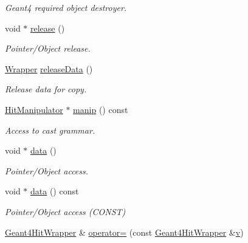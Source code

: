 \begin{DoxyCompactItemize}
\begin{DoxyCompactList}\small\item\em Geant4 required object destroyer. \end{DoxyCompactList}\item 
void $\ast$ \hyperlink{class_d_d4hep_1_1_simulation_1_1_geant4_hit_wrapper_a1af3edf59bb6c955fe91582394854acd}{release} ()
\begin{DoxyCompactList}\small\item\em Pointer/\+Object release. \end{DoxyCompactList}\item 
\hyperlink{class_d_d4hep_1_1_simulation_1_1_geant4_hit_wrapper_a4779e35eba7d553e0f2d497c49a42ec6}{Wrapper} \hyperlink{class_d_d4hep_1_1_simulation_1_1_geant4_hit_wrapper_acec7d2a18d078071d5714dd4a0c45739}{release\+Data} ()
\begin{DoxyCompactList}\small\item\em Release data for copy. \end{DoxyCompactList}\item 
\hyperlink{class_d_d4hep_1_1_simulation_1_1_geant4_hit_wrapper_1_1_hit_manipulator}{Hit\+Manipulator} $\ast$ \hyperlink{class_d_d4hep_1_1_simulation_1_1_geant4_hit_wrapper_a0a47f87785a7cc9af60ab9a0f21dcf44}{manip} () const
\begin{DoxyCompactList}\small\item\em Access to cast grammar. \end{DoxyCompactList}\item 
void $\ast$ \hyperlink{class_d_d4hep_1_1_simulation_1_1_geant4_hit_wrapper_af7b7738a7307f1f9372dc37efc319dc6}{data} ()
\begin{DoxyCompactList}\small\item\em Pointer/\+Object access. \end{DoxyCompactList}\item 
void $\ast$ \hyperlink{class_d_d4hep_1_1_simulation_1_1_geant4_hit_wrapper_a9d048768dce3e8f79898e98ea90b0041}{data} () const
\begin{DoxyCompactList}\small\item\em Pointer/\+Object access (C\+O\+N\+ST) \end{DoxyCompactList}\item 
\hyperlink{class_d_d4hep_1_1_simulation_1_1_geant4_hit_wrapper}{Geant4\+Hit\+Wrapper} \& \hyperlink{class_d_d4hep_1_1_simulation_1_1_geant4_hit_wrapper_a93a51629cca576b0ff7328981b7c71ad}{operator=} (const \hyperlink{class_d_d4hep_1_1_simulation_1_1_geant4_hit_wrapper}{Geant4\+Hit\+Wrapper} \&\hyperlink{_multi_view_8cpp_a8320ee13ac034dbf6d624fe8953dd337}{v})

\end{DoxyCompactItemize}

